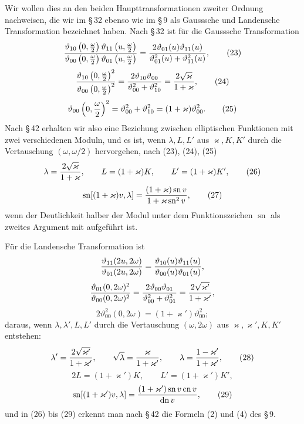 \documentclass[11pt]{article}
\providecommand{\tht}{\vartheta}
\providecommand{\sn}{\operatorname{sn}}
\providecommand{\cn}{\operatorname{cn}}
\providecommand{\dn}{\operatorname{dn}}
\begin{document}
Wir wollen dies an den beiden Haupttransformationen zweiter Ordnung nachweisen, die wir im \S\,32 ebenso wie im \S\,9 als Gausssche und Landensche Transformation bezeichnet haben. Nach \S\,32 ist für die Gausssche Transformation
\begin{equation}
{\tht_{10}\left(0,{\omega\over2}\right)\tht_{11}\left(u,{\omega\over2}\right)
\over
\tht_{00}\left(0,{\omega\over2}\right)\tht_{01}\left(u,{\omega\over2}\right)}
={2\tht_{01}(u)\tht_{11}(u)
\over \tht_{01}^{2}(u)+\tht_{11}^{2}(u)},
\tag{23}
\end{equation}
\begin{equation}
{\tht_{10}\left(0,{\omega\over2}\right)^2
\over
\tht_{00}\left(0,{\omega\over2}\right)^2}
={2\tht_{10}\tht_{00}\over\tht_{00}^{2}+\tht_{10}^{2}}
={2\sqrt\varkappa\over1+\varkappa},
\tag{24}
\end{equation}
\begin{equation}
\tht_{00}\left(0,{\omega\over2}\right)^2=\tht_{00}^{2}+\tht_{10}^{2}=(1+\varkappa)\tht_{00}^{2}.
\tag{25}
\end{equation}
Nach \S\,42 erhalten wir also eine Beziehung zwischen elliptischen Funktionen mit zwei verschiedenen Moduln, und es ist, wenn $\lambda,L,L'$ aus $\varkappa,K,K'$ durch die Vertauschung $(\omega,\omega/2)$ hervorgehen, nach (23), (24), (25)
\begin{equation}
\lambda={2\sqrt\varkappa\over1+\varkappa},
\qquad
L=(1+\varkappa)K,
\qquad
L'=(1+\varkappa)K',
\tag{26}
\end{equation}
\begin{equation}
\sn[(1+\varkappa)v,\lambda]=
{(1+\varkappa)\sn v
\over 1+\varkappa\sn^2v},
\tag{27}
\end{equation}
wenn der Deutlichkeit halber der Modul unter dem Funktionszeichen $\sn$ als zweites Argument mit aufgeführt ist.

Für die Landensche Transformation ist
\[
{\tht_{11}(2u,2\omega)\over\tht_{01}(2u,2\omega)}
={\tht_{10}(u)\tht_{11}(u)\over\tht_{00}(u)\tht_{01}(u)},
\]
\[
{\tht_{01}(0,2\omega)^2\over\tht_{00}(0,2\omega)^2}
={2\tht_{00}\tht_{01}\over\tht_{00}^{2}+\tht_{01}^{2}}
={2\sqrt{\varkappa'}\over1+\varkappa'},
\]
\[
2\tht_{00}^{2}(0,2\omega)=(1+\varkappa')\tht_{00}^{2};
\]
daraus, wenn $\lambda,\lambda',L,L'$ durch die Vertauschung $(\omega,2\omega)$ aus $\varkappa,\varkappa',K,K'$ entstehen:
\begin{equation}
\lambda'={2\sqrt{\varkappa'}\over1+\varkappa'},
\qquad
\sqrt\lambda={\varkappa\over1+\varkappa'},
\qquad
\lambda={1-\varkappa'\over1+\varkappa'},
\tag{28}
\end{equation}
\[
2L=(1+\varkappa')K,
\qquad
L'=(1+\varkappa')K',
\]
\begin{equation}
\sn[(1+\varkappa')v,\lambda]=
{(1+\varkappa')\sn v\cn v\over\dn v},
\tag{29}
\end{equation}
und in (26) bis (29) erkennt man nach \S\,42 die Formeln (2) und (4) des \S\,9.
\end{document}

